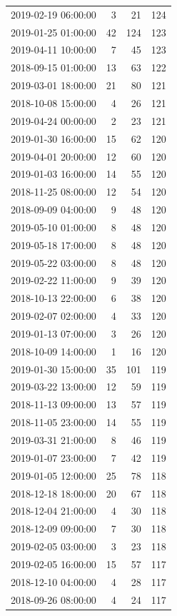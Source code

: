 \begin{tabular}{lrrr}
2019-02-19 06:00:00 & 3 & 21 & 124 \\
2019-01-25 01:00:00 & 42 & 124 & 123 \\
2019-04-11 10:00:00 & 7 & 45 & 123 \\
2018-09-15 01:00:00 & 13 & 63 & 122 \\
2019-03-01 18:00:00 & 21 & 80 & 121 \\
2018-10-08 15:00:00 & 4 & 26 & 121 \\
2019-04-24 00:00:00 & 2 & 23 & 121 \\
2019-01-30 16:00:00 & 15 & 62 & 120 \\
2019-04-01 20:00:00 & 12 & 60 & 120 \\
2019-01-03 16:00:00 & 14 & 55 & 120 \\
2018-11-25 08:00:00 & 12 & 54 & 120 \\
2018-09-09 04:00:00 & 9 & 48 & 120 \\
2019-05-10 01:00:00 & 8 & 48 & 120 \\
2019-05-18 17:00:00 & 8 & 48 & 120 \\
2019-05-22 03:00:00 & 8 & 48 & 120 \\
2019-02-22 11:00:00 & 9 & 39 & 120 \\
2018-10-13 22:00:00 & 6 & 38 & 120 \\
2019-02-07 02:00:00 & 4 & 33 & 120 \\
2019-01-13 07:00:00 & 3 & 26 & 120 \\
2018-10-09 14:00:00 & 1 & 16 & 120 \\
2019-01-30 15:00:00 & 35 & 101 & 119 \\
2019-03-22 13:00:00 & 12 & 59 & 119 \\
2018-11-13 09:00:00 & 13 & 57 & 119 \\
2018-11-05 23:00:00 & 14 & 55 & 119 \\
2019-03-31 21:00:00 & 8 & 46 & 119 \\
2019-01-07 23:00:00 & 7 & 42 & 119 \\
2019-01-05 12:00:00 & 25 & 78 & 118 \\
2018-12-18 18:00:00 & 20 & 67 & 118 \\
2018-12-04 21:00:00 & 4 & 30 & 118 \\
2018-12-09 09:00:00 & 7 & 30 & 118 \\
2019-02-05 03:00:00 & 3 & 23 & 118 \\
2019-02-05 16:00:00 & 15 & 57 & 117 \\
2018-12-10 04:00:00 & 4 & 28 & 117 \\
2018-09-26 08:00:00 & 4 & 24 & 117 \\

\end{tabular}
